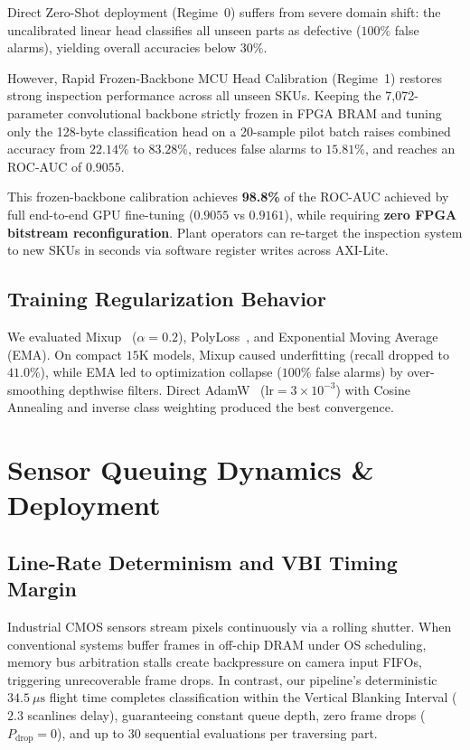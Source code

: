 \documentclass[conference]{IEEEtran}
\begin{document}
Direct Zero-Shot deployment (Regime~0) suffers from severe domain shift: the uncalibrated linear head classifies all unseen parts as defective ($100\%$ false alarms), yielding overall accuracies below $30\%$.

However, Rapid Frozen-Backbone MCU Head Calibration (Regime~1) restores strong inspection performance across all unseen SKUs. Keeping the 7,072-parameter convolutional backbone strictly frozen in FPGA BRAM and tuning only the 128-byte classification head on a 20-sample pilot batch raises combined accuracy from $22.14\%$ to $\mathbf{83.28\%}$, reduces false alarms to $15.81\%$, and reaches an ROC-AUC of $\mathbf{0.9055}$. 

This frozen-backbone calibration achieves \textbf{98.8\%} of the ROC-AUC achieved by full end-to-end GPU fine-tuning ($0.9055$ vs $0.9161$), while requiring \textbf{zero FPGA bitstream reconfiguration}. Plant operators can re-target the inspection system to new SKUs in seconds via software register writes across AXI-Lite.

\subsection{Training Regularization Behavior}
We evaluated Mixup~\cite{zhang2018mixup} ($\alpha=0.2$), PolyLoss~\cite{leng2022polyloss}, and Exponential Moving Average (EMA). On compact $15\text{K}$ models, Mixup caused underfitting (recall dropped to $41.0\%$), while EMA led to optimization collapse ($100\%$ false alarms) by over-smoothing depthwise filters. Direct AdamW~\cite{loshchilov2019decoupled,kingma2014adam} ($\text{lr}=3 \times 10^{-3}$) with Cosine Annealing and inverse class weighting produced the best convergence.

\section{Sensor Queuing Dynamics \& Deployment}
\label{sec:discussion}

\subsection{Line-Rate Determinism and VBI Timing Margin}
Industrial CMOS sensors stream pixels continuously via a rolling shutter. When conventional systems buffer frames in off-chip DRAM under OS scheduling, memory bus arbitration stalls create backpressure on camera input FIFOs, triggering unrecoverable frame drops. In contrast, our pipeline's deterministic $34.5\ \mu\text{s}$ flight time completes classification within the Vertical Blanking Interval ($2.3$ scanlines delay), guaranteeing constant queue depth, zero frame drops ($P_{\text{drop}} = 0$), and up to 30 sequential evaluations per traversing part.
\end{document}
